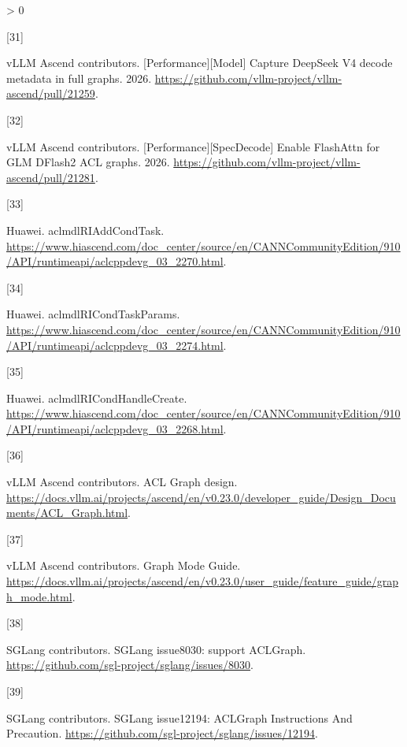 \documentclass[
  UTF8,
  zihao=5]{ctexart}
\newlength{\cslhangindent}
\newlength{\csllabelwidth}
\newenvironment{CSLReferences}[2] %
 {%
  \setlength{\parindent}{0pt}
  \ifodd #1 \everypar{\setlength{\hangindent}{\cslhangindent}}\ignorespaces\fi
  \ifnum #2 > 0
  \setlength{\parskip}{#2\baselineskip}
  \fi
 }%
 {}
\newcommand{\CSLLeftMargin}[1]{\parbox[t]{\csllabelwidth}{#1}}
\newcommand{\CSLRightInline}[1]{\parbox[t]{\linewidth - \csllabelwidth}{#1}\par}
\begin{document}
\begin{CSLReferences}{0}{0}
\leavevmode{}%
\CSLLeftMargin{{[}31{]} }%
\CSLRightInline{vLLM Ascend contributors. {{[}Performance{]}{[}Model{]}
Capture DeepSeek V4 decode metadata in full graphs}. 2026.
\url{https://github.com/vllm-project/vllm-ascend/pull/21259}.}

\leavevmode{}%
\CSLLeftMargin{{[}32{]} }%
\CSLRightInline{vLLM Ascend contributors.
{{[}Performance{]}{[}SpecDecode{]} Enable FlashAttn for GLM DFlash2 ACL
graphs}. 2026.
\url{https://github.com/vllm-project/vllm-ascend/pull/21281}.}

\leavevmode{}%
\CSLLeftMargin{{[}33{]} }%
\CSLRightInline{Huawei. {aclmdlRIAddCondTask}.
\url{https://www.hiascend.com/doc_center/source/en/CANNCommunityEdition/910/API/runtimeapi/aclcppdevg_03_2270.html}.}

\leavevmode{}%
\CSLLeftMargin{{[}34{]} }%
\CSLRightInline{Huawei. {aclmdlRICondTaskParams}.
\url{https://www.hiascend.com/doc_center/source/en/CANNCommunityEdition/910/API/runtimeapi/aclcppdevg_03_2274.html}.}

\leavevmode{}%
\CSLLeftMargin{{[}35{]} }%
\CSLRightInline{Huawei. {aclmdlRICondHandleCreate}.
\url{https://www.hiascend.com/doc_center/source/en/CANNCommunityEdition/910/API/runtimeapi/aclcppdevg_03_2268.html}.}

\leavevmode{}%
\CSLLeftMargin{{[}36{]} }%
\CSLRightInline{vLLM Ascend contributors. {ACL Graph design}.
\url{https://docs.vllm.ai/projects/ascend/en/v0.23.0/developer_guide/Design_Documents/ACL_Graph.html}.}

\leavevmode{}%
\CSLLeftMargin{{[}37{]} }%
\CSLRightInline{vLLM Ascend contributors. {Graph Mode Guide}.
\url{https://docs.vllm.ai/projects/ascend/en/v0.23.0/user_guide/feature_guide/graph_mode.html}.}

\leavevmode{}%
\CSLLeftMargin{{[}38{]} }%
\CSLRightInline{SGLang contributors. {SGLang issue8030: support
ACLGraph}. \url{https://github.com/sgl-project/sglang/issues/8030}.}

\leavevmode{}%
\CSLLeftMargin{{[}39{]} }%
\CSLRightInline{SGLang contributors. {SGLang issue12194: ACLGraph
Instructions And Precaution}.
\url{https://github.com/sgl-project/sglang/issues/12194}.}


\end{CSLReferences}
\end{document}
